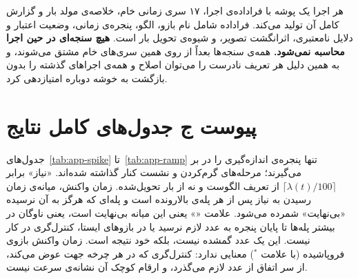 هر اجرا یک پوشه با فراداده‌ی اجرا، ۱۷ سری زمانی خام، خلاصه‌ی مولد بار و گزارش کامل آن تولید
می‌کند. فراداده شامل نام بازو، الگو، پنجره‌ی زمانی، وضعیت اعتبار و دلایل نامعتبری، اثرانگشت
تصویر، و شیوه‌ی تحویل بار است. \textbf{هیچ سنجه‌ای در حین اجرا محاسبه نمی‌شود.} همه‌ی
سنجه‌ها بعداً از روی همین سری‌های خام مشتق می‌شوند، و به همین دلیل هر تعریف نادرست را می‌توان
اصلاح و همه‌ی اجراهای گذشته را بدون بازگشت به خوشه دوباره امتیازدهی کرد.

\section*{پیوست ج \mdash{} جدول‌های کامل نتایج}

جدول‌های~\ref{tab:app-spike} تا~\ref{tab:app-ramp} تنها پنجره‌ی اندازه‌گیری را در بر
می‌گیرند؛ مرحله‌های گرم‌کردن و نشست
کنار گذاشته شده‌اند. «نیاز» برابر $\lceil \lambda(t)/100 \rceil$ از تعریف الگوست و نه از بار
تحویل‌شده. زمان واکنش، میانه‌ی زمان رسیدن به نیاز پس از هر پله‌ی بالارونده است و پله‌ای که هرگز
به آن نرسیده «بی‌نهایت» شمرده می‌شود. علامت «\lr{---}» یعنی این میانه بی‌نهایت است، یعنی ناوگان در
بیشتر پله‌ها تا پایان پنجره به عدد لازم نرسید \mdash{} یا در بازوهای ایستا، کنترل‌گری در کار نیست.
این یک عدد گمشده نیست، بلکه خود نتیجه است. زمان واکنش بازوی فروپاشیده (با علامت $^{*}$) معنایی
ندارد: کنترل‌گری که در هر چرخه جهت عوض می‌کند، از سر اتفاق از عدد لازم می‌گذرد، و ارقام کوچک آن
نشانه‌ی سرعت نیست.

